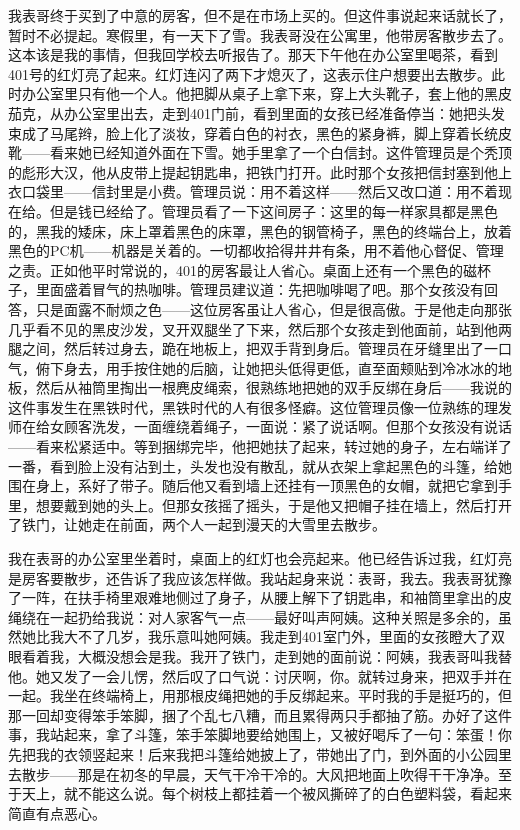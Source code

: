 我表哥终于买到了中意的房客，但不是在市场上买的。但这件事说起来话就长了，暂时不必提起。寒假里，有一天下了雪。我表哥没在公寓里，他带房客散步去了。这本该是我的事情，但我回学校去听报告了。那天下午他在办公室里喝茶，看到401号的红灯亮了起来。红灯连闪了两下才熄灭了，这表示住户想要出去散步。此时办公室里只有他一个人。他把脚从桌子上拿下来，穿上大头靴子，套上他的黑皮茄克，从办公室里出去，走到401门前，看到里面的女孩已经准备停当：她把头发束成了马尾辫，脸上化了淡妆，穿着白色的衬衣，黑色的紧身裤，脚上穿着长统皮靴——看来她已经知道外面在下雪。她手里拿了一个白信封。这件管理员是个秃顶的彪形大汉，他从皮带上提起钥匙串，把铁门打开。此时那个女孩把信封塞到他上衣口袋里——信封里是小费。管理员说：用不着这样——然后又改口道：用不着现在给。但是钱已经给了。管理员看了一下这间房子：这里的每一样家具都是黑色的，黑我的矮床，床上罩着黑色的床罩，黑色的钢管椅子，黑色的终端台上，放着黑色的PC机——机器是关着的。一切都收拾得井井有条，用不着他心督促、管理之责。正如他平时常说的，401的房客最让人省心。桌面上还有一个黑色的磁杯子，里面盛着冒气的热咖啡。管理员建议道：先把咖啡喝了吧。那个女孩没有回答，只是面露不耐烦之色——这位房客虽让人省心，但是很高傲。于是他走向那张几乎看不见的黑皮沙发，叉开双腿坐了下来，然后那个女孩走到他面前，站到他两腿之间，然后转过身去，跪在地板上，把双手背到身后。管理员在牙缝里出了一口气，俯下身去，用手按住她的后脑，让她把头低得更低，直至面颊贴到冷冰冰的地板，然后从袖筒里掏出一根麂皮绳索，很熟练地把她的双手反绑在身后——我说的这件事发生在黑铁时代，黑铁时代的人有很多怪癖。这位管理员像一位熟练的理发师在给女顾客洗发，一面缠绕着绳子，一面说：紧了说话啊。但那个女孩没有说话——看来松紧适中。等到捆绑完毕，他把她扶了起来，转过她的身子，左右端详了一番，看到脸上没有沾到土，头发也没有散乱，就从衣架上拿起黑色的斗篷，给她围在身上，系好了带子。随后他又看到墙上还挂有一顶黑色的女帽，就把它拿到手里，想要戴到她的头上。但那女孩摇了摇头，于是他又把帽子挂在墙上，然后打开了铁门，让她走在前面，两个人一起到漫天的大雪里去散步。 

我在表哥的办公室里坐着时，桌面上的红灯也会亮起来。他已经告诉过我，红灯亮是房客要散步，还告诉了我应该怎样做。我站起身来说：表哥，我去。我表哥犹豫了一阵，在扶手椅里艰难地侧过了身子，从腰上解下了钥匙串，和袖筒里拿出的皮绳绕在一起扔给我说：对人家客气一点——最好叫声阿姨。这种关照是多余的，虽然她比我大不了几岁，我乐意叫她阿姨。我走到401室门外，里面的女孩瞪大了双眼看着我，大概没想会是我。我开了铁门，走到她的面前说：阿姨，我表哥叫我替他。她又发了一会儿愣，然后叹了口气说：讨厌啊，你。就转过身来，把双手并在一起。我坐在终端椅上，用那根皮绳把她的手反绑起来。平时我的手是挺巧的，但那一回却变得笨手笨脚，捆了个乱七八糟，而且累得两只手都抽了筋。办好了这件事，我站起来，拿了斗篷，笨手笨脚地要给她围上，又被好喝斥了一句：笨蛋！你先把我的衣领竖起来！后来我把斗篷给她披上了，带她出了门，到外面的小公园里去散步——那是在初冬的早晨，天气干冷干冷的。大风把地面上吹得干干净净。至于天上，就不能这么说。每个树枝上都挂着一个被风撕碎了的白色塑料袋，看起来简直有点恶心。 

